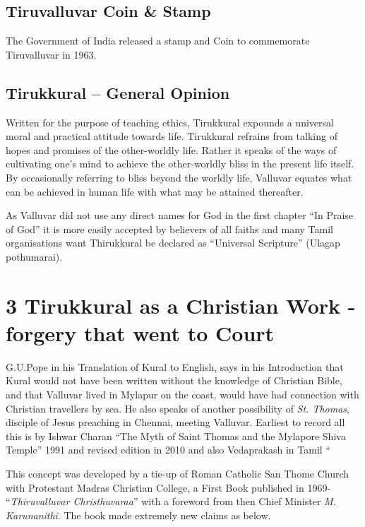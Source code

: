 \subsection*{Tiruvalluvar Coin \& Stamp}

The Government of India released a stamp and Coin to commemorate Tiruvalluvar in 1963.\endnote{}


\subsection*{Tirukkural – General Opinion}

Written for the purpose of teaching ethics, Tirukkural expounds a universal moral and practical attitude towards life. Tirukkural refrains from talking of hopes and promises of the other-worldly life. Rather it speaks of the ways of cultivating one's mind to achieve the other-worldly bliss in the present life itself. By occasionally referring to bliss beyond the worldly life, Valluvar equates what can be achieved in human life with what may be attained thereafter.

As Valluvar did not use any direct names for God in the first chapter “In Praise of God” it is more easily accepted by believers of all faiths and many Tamil organisations want Thirukkural be declared as “Universal Scripture” (Ulagap pothumarai).


\section*{3 Tirukkural as a Christian Work - forgery that went to Court}

G.U.Pope in his Translation of Kural to English, says in his Introduction that Kural would not have been written without the knowledge of Christian Bible, and that Valluvar lived in Mylapur on the coast, would have had connection with Christian travellers by sea. He also speaks of another possibility of \textit{St. Thomas}, disciple of Jesus preaching in Chennai, meeting Valluvar. Earliest to record all this is by Ishwar Charan\endnote{} “The Myth of Saint Thomas and the Mylapore Shiva Temple” 1991 and revised edition in 2010 and also Vedaprakash in Tamil “ 

This concept was developed by a tie-up of Roman Catholic San Thome Church with Protestant Madras Christian College\endnote{}, a First Book published in 1969- “\textit{Thiruvalluvar Christhuvaraa}” with a foreword from then Chief Minister \textit{M. Karunanithi}\endnote{}. The book made extremely new claims as below.

